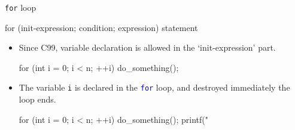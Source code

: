\documentclass[handout]{beamer}
\newcommand{\blue}[1]{\textcolor{blue}{#1}}
\newcommand{\ttt}[1]{\texttt{#1}}
\newcommand{\bluett}[1]{\blue{\ttt{#1}}}
\begin{document}
\begin{frame}[fragile]{\ttt{for} loop}
    \begin{cpp}
for (init-expression; condition; expression)
    statement
    \end{cpp}
    \begin{itemize}
        \item Since C99, variable declaration is allowed in the `init-expression' part.
        \begin{cpp}
for (int i = 0; i < n; ++i)
    do_something();
        \end{cpp}
        \pause
        \item The variable \ttt{i} is declared in the \bluett{for} loop, and destroyed immediately the loop ends.
        \begin{cpp}
for (int i = 0; i < n; ++i)
    do_something();
printf("%
        \end{cpp}
    \end{itemize}
\end{frame}
\end{document}
